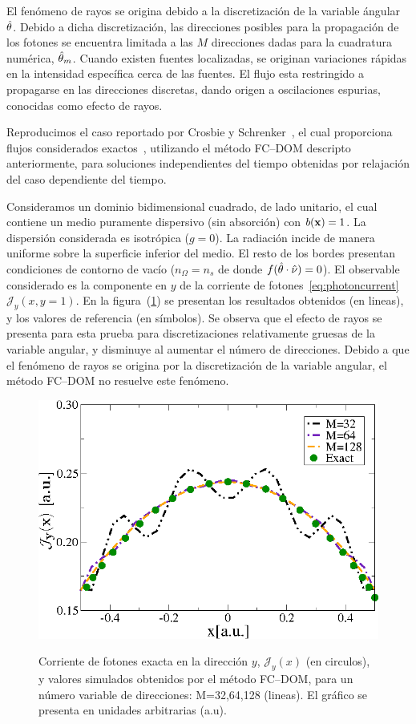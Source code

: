 El fenómeno de rayos se origina debido a la discretización 
de la variable ángular $\hat{\theta}$. Debido a dicha discretización, 
las direcciones posibles para la propagación de los fotones 
se encuentra limitada a las $M$ direcciones dadas para la cuadratura 
numérica, $\hat{\theta}_m$. Cuando existen fuentes localizadas, 
se originan variaciones rápidas en la intensidad específica 
cerca de las fuentes. El flujo esta restringido a propagarse 
en las direcciones discretas, dando origen a oscilaciones 
espurias, conocidas como efecto de rayos.

Reproducimos el caso reportado por Crosbie y Schrenker~\cite{Crosbie1984}, 
el cual proporciona flujos considerados exactos~\cite{Ramankutty1997,tagnekamdem2015}, 
utilizando el método FC--DOM descripto anteriormente, para soluciones independientes 
del tiempo obtenidas por relajación del caso dependiente del tiempo.

Consideramos un dominio bidimensional cuadrado, de lado unitario, 
el cual contiene un medio puramente dispersivo (sin absorción) 
con $b(\mathbf{x})=1$. La dispersión considerada es isotrópica ($g=0$). 
La radiación incide de manera uniforme sobre la superficie inferior del medio. 
El resto de los bordes presentan condiciones de contorno de vacío ($n_{\Omega}=n_{s}$ 
de donde $f(\hat{\theta} \cdot \hat{\nu})=0$). El observable considerado es la componente en $y$ de la corriente de fotones~\eqref{eq:photoncurrent} $\mathcal{J}_y(x,y=1)$. En la figura~(\ref{fig:fluxph3}) 
se presentan los resultados obtenidos (en lineas), y los valores de referencia (en símbolos). 
Se observa que el efecto de rayos se presenta para esta prueba para discretizaciones 
relativamente gruesas de la variable angular, y disminuye al aumentar 
el número de direcciones. Debido a que el fenómeno de rayos se origina 
por la discretización de la variable angular, el método FC--DOM 
no resuelve este fenómeno. 
\begin{figure}[h!]
\centering
  \includegraphics[width=0.48\linewidth]{figuras/raycurrent.eps}\\
  \caption{
Corriente de fotones exacta en la dirección $y$, $\mathcal{J}_y(x)$ (en circulos), 
y valores simulados obtenidos por el método FC--DOM, 
para un número variable de direcciones: M=32,64,128 (lineas). El gráfico 
se presenta en unidades arbitrarias (a.u).}
 \label{fig:fluxph3}
\end{figure}

